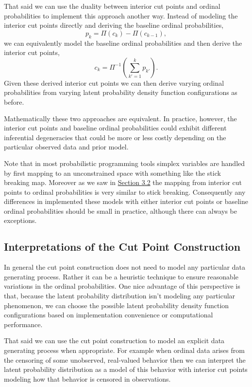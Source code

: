 \documentclass[
  letterpaper,
  DIV=11,
  numbers=noendperiod]{scrartcl}
\begin{document}
That said we can use the duality between interior cut points and ordinal
probabilities to implement this approach another way. Instead of
modeling the interior cut points directly and deriving the baseline
ordinal probabilities, \[
p_{k} = \Pi(c_{k}) - \Pi(c_{k - 1}),
\] we can equivalently model the baseline ordinal probabilities and then
derive the interior cut points, \[
c_{k}
=
\Pi^{-1} \left( \sum_{k' = 1}^{k} p_{k'} \right).
\] Given these derived interior cut points we can then derive varying
ordinal probabilities from varying latent probability density function
configurations as before.

Mathematically these two approaches are equivalent. In practice,
however, the interior cut points and baseline ordinal probabilities
could exhibit different inferential degeneracies that could be more or
less costly depending on the particular observed data and prior model.

Note that in most probabilistic programming tools simplex variables are
handled by first mapping to an unconstrained space with something like
the stick breaking map. Moreover as we saw in
\hyperref[sec:duality]{Section 3.2} the mapping from interior cut points
to ordinal probabilities is very similar to stick breaking. Consequently
any differences in implemented these models with either interior cut
points or baseline ordinal probabilities should be small in practice,
although there can always be exceptions.

\subsection{Interpretations of the Cut Point
Construction}\label{interpretations-of-the-cut-point-construction}

In general the cut point construction does not need to model any
particular data generating process. Rather it can be a heuristic
technique to ensure reasonable variations in the ordinal probabilities.
One nice advantage of this perspective is that, because the latent
probability distribution isn't modeling any particular phenomenon, we
can choose the possible latent probability density function
configurations based on implementation convenience or computational
performance.

That said we can use the cut point construction to model an explicit
data generating process when appropriate. For example when ordinal data
arises from the censoring of some unobserved, real-valued behavior then
we can interpret the latent probability distribution as a model of this
behavior with interior cut points modeling how that behavior is censored
in observations.
\end{document}
